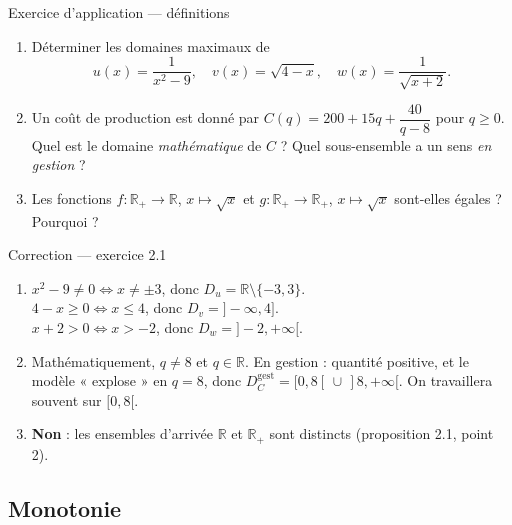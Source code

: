 \documentclass[aspectratio=169,11pt]{beamer}
\newcommand{\R}{\mathbb{R}}
\newcommand{\important}[1]{\textbf{\color{DarkRed}#1}}
\newcommand{\fonc}[3]{#1\colon #2\to #3}
\begin{document}
\begin{frame}{Exercice d'application --- définitions}
	\begin{exercicebox}[Exercice 2.1]
		\begin{enumerate}
			\item Déterminer les domaines maximaux de
			\[
				u(x)=\frac{1}{x^2-9},\quad
				v(x)=\sqrt{4-x},\quad
				w(x)=\frac{1}{\sqrt{x+2}}.
			\]
			\item Un coût de production est donné par
			$C(q)=200+15q+\dfrac{40}{q-8}$ pour $q\ge 0$.
			Quel est le domaine \emph{mathématique} de $C$ ? Quel sous-ensemble
			a un sens \emph{en gestion} ?
			\item Les fonctions $\fonc{f}{\R_+}{\R}$, $x\longmapsto \sqrt{x}$ et
			$\fonc{g}{\R_+}{\R_+}$, $x\longmapsto \sqrt{x}$ sont-elles égales ? Pourquoi ?
		\end{enumerate}
	\end{exercicebox}
\end{frame}

\begin{frame}{Correction --- exercice 2.1}
	\begin{definitionbox}[Correction]
		\begin{enumerate}
			\item $x^2-9\neq 0\iff x\neq\pm 3$, donc $D_u=\R\setminus\{-3,3\}$.\\
			$4-x\ge 0\iff x\le 4$, donc $D_v=]-\infty,4]$.\\
			$x+2>0\iff x>-2$, donc $D_w=]-2,+\infty[$.
			\item Mathématiquement, $q\neq 8$ et $q\in\R$. En gestion : quantité
			positive, et le modèle « explose » en $q=8$, donc
			$D_C^{\text{gest}}=[0,8[\,\cup\,]8,+\infty[$. On travaillera souvent sur $[0,8[$.
			\item \important{Non} : les ensembles d'arrivée $\R$ et $\R_+$ sont distincts
			(proposition 2.1, point 2).
		\end{enumerate}
	\end{definitionbox}
\end{frame}

\subsection{Monotonie}
\end{document}
